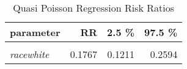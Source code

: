 \begin{table}

\caption{\label{tab:quasipoisson_reg_RR}Quasi Poisson Regression Risk Ratios}
\centering
\begin{tabular}[t]{>{}lrrr}
\toprule
parameter & RR & 2.5 \% & 97.5 \%\\
\midrule
\em{\cellcolor{gray!6}{(Intercept)}} & \cellcolor{gray!6}{0.5220} & \cellcolor{gray!6}{0.3873} & \cellcolor{gray!6}{0.6848}\\
\em{racewhite} & 0.1767 & 0.1211 & 0.2594\\
\bottomrule
\end{tabular}
\end{table}
